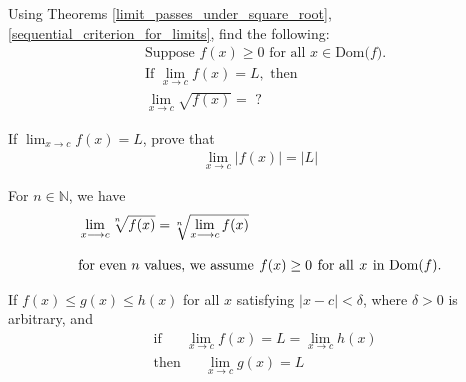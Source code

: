 \begin{exercise}
Using Theorems \ref{limit_passes_under_square_root}, \ref{sequential_criterion_for_limits}, find the following:
\begin{align*}
    &\text{Suppose} \hspace{4pt} f(x) \geq 0 \hspace{4pt} \text{for all} \hspace{4pt} x \in \text{Dom($f$)}.\\[2ex]
    &\text{If} \hspace{4pt} \lim_{x \longrightarrow c} f(x) = L, \hspace{4pt} \text{then}\\[2ex]
    &\lim_{x \longrightarrow c} \sqrt{f(x)} = \hspace{4pt} ?
\end{align*}
\end{exercise}

\begin{exercise}
If $\lim_{x \longrightarrow c} f(x) = L$, prove that 
\begin{align*}
    \lim_{x \longrightarrow c} \lvert f(x) \rvert = \lvert L \rvert 
\end{align*}
\end{exercise}

\begin{theorem}
For $n \in \mathbb{N}$, we have
\begin{align*}
    &\lim_{x \longrightarrow c} \sqrt[\leftroot{2}\uproot{2}n]{f(x)} = \sqrt[\leftroot{2}\uproot{2}n]{\lim_{x \longrightarrow c} f(x)}\\[2ex]
    &\text{for even $n$ values, we assume} \hspace{4pt} f(x) \geq 0 \hspace{4pt} \text{for all} \hspace{4pt} x \hspace{4pt} \text{in Dom($f$)}. 
\end{align*}
\end{theorem}

\begin{theorem}
If $f(x) \leq g(x) \leq h(x)$ for all $x$ satisfying $\lvert x - c \rvert < \delta$, where $\delta > 0$ is arbitrary, and
\begin{align*}
    &\text{if} \hspace{20pt} \lim_{x \longrightarrow c} f(x) = L = \lim_{x \longrightarrow c} h(x)\\[2ex]
    &\text{then} \hspace{20pt} \lim_{x \longrightarrow c} g(x) = L
\end{align*}
\end{theorem}